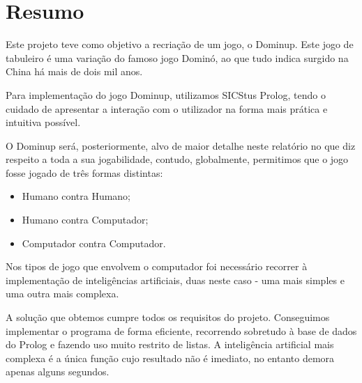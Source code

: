 \documentclass[a4paper]{article}
\begin{document}


\newpage

\section*{Resumo}

Este projeto teve como objetivo a recriação de um jogo, o Dominup. Este jogo de tabuleiro é uma variação do famoso jogo Dominó, ao que tudo indica surgido na China há mais de dois mil anos.

Para implementação do jogo Dominup, utilizamos SICStus Prolog, tendo o cuidado de apresentar a interação com o utilizador na forma mais prática e intuitiva possível.

O Dominup será, posteriormente, alvo de maior detalhe neste relatório no que diz respeito a toda a sua jogabilidade, contudo, globalmente, permitimos que o jogo fosse jogado de três formas distintas:

\begin{itemize}
	\item Humano contra Humano;
	\item Humano contra Computador;
	\item Computador contra Computador.
\end{itemize}

Nos tipos de jogo que envolvem o computador foi necessário recorrer à implementação de inteligências artificiais, duas neste caso - uma mais simples e uma outra mais complexa.

A solução que obtemos cumpre todos os requisitos do projeto. Conseguimos implementar o programa de forma eficiente, recorrendo sobretudo à base de dados do Prolog e fazendo uso muito restrito de listas. A inteligência artificial mais complexa é a única função cujo resultado não é imediato, no entanto demora apenas alguns segundos.

\newpage

\tableofcontents


\newpage
\end{document}
